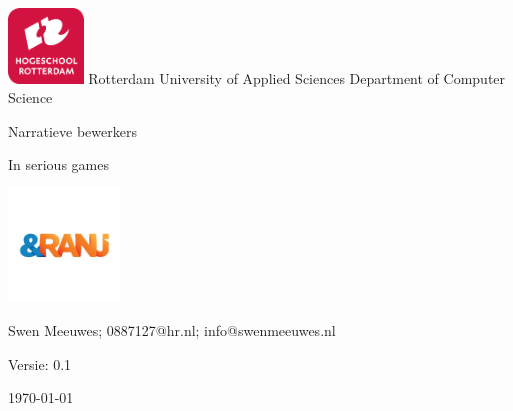 \documentclass{report}
\makeatletter
\newcommand{\versionnumber}{0.1}
\newcommand{\name}{Swen Meeuwes}
\newcommand{\email}{0887127@hr.nl; info@swenmeeuwes.nl}
\newcommand{\institution}{Rotterdam University of Applied Sciences}
\renewcommand{\title}{Narratieve bewerkers}
\newcommand{\subtitle}{In serious games}
\makeatother
\begin{document}
\begin{titlepage} %
        \centering
        \includegraphics[width=2cm]{University}
        \institution{}
        Department of Computer Science
        \par
        \vspace{4\baselineskip}
        {\Huge\title\par}
        {\Large\subtitle\par}
        \par
        \includegraphics[width=3cm]{Organisation}
        \vspace{4\baselineskip}
        \par
        {\Large\name; \email\par}
        \vfill
        {\hfill Versie: \versionnumber\par}
        {\hfill \today}
        \thispagestyle{empty}
\end{titlepage}




\tableofcontents




















\renewcommand{\bibname}{Literatuurlijst}
{}
\nocite{*}
\end{document}

